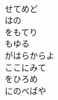 \documentclass[10pt,b5j]{tarticle} %
\begin{document}
\begin{enumerate}
\begin{minipage}[c]{\blocksize}
        \vspace{\linespace}
        \item
        \\
        せてめど\\
        はの\\
        をもてり\\
        もゆる\\
        がはらからよ\\
        ここにみて\\
        をひろめ\\
        にのべばや\\
    
    \end{minipage}
\end{enumerate} %
\end{document}
